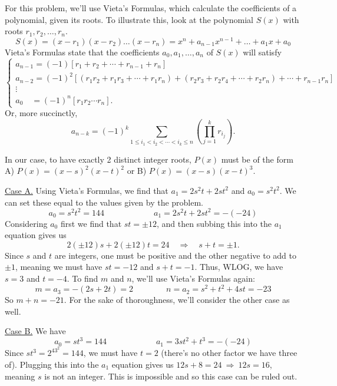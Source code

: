\begin{solution}[D]
    For this problem, we'll use Vieta's Formulas, which calculate the coefficients of a polynomial, given its roots. To illustrate this, look at the polynomial $S(x)$ with roots \( r_1, r_2, \dots, r_n \).
    \[
        S(x) = (x-r_1)(x-r_2)\dots(x-r_n) = x^n + a_{n-1} x^{n-1} + \dots + a_1 x + a_0
    \]
    Vieta's Formulas state that the coefficients \( a_0, a_1, \dots, a_n \) of \(S(x)\) will satisfy
    \begin{equation*}
    \begin{cases}
    a_{n-1} = (-1)[r_1 + r_2 + \cdots + r_{n-1} + r_n] \\
    a_{n-2} = (-1)^2[(r_1r_2 + r_1r_3 + \cdots + r_1r_n) + (r_2r_3 + r_2r_4 + \cdots + r_2r_n) + \cdots + r_{n-1}r_n] \\
    \vdots \\
     a_0 \quad = (-1)^n[r_1r_2 \cdots r_n].
    \end{cases}
    \end{equation*}
    Or, more succinctly, 
    \[
        a_{n-k}=(-1)^k\!\sum_{1 \leq i_1 < i_2 < \cdots < i_k \leq n} 
        \!\left( \prod_{j=1}^k r_{i_j} \right). 
    \]
    
    In our case, to have exactly 2 distinct integer roots, $P(x)$ must be of the form A) $P(x)=(x-s)^2(x-t)^2$ or B) $P(x)=(x-s)(x-t)^3$.
    
    \underline{Case A.} Using Vieta's Formulas, we find that \(a_1=2s^2t+2st^2\) and \(a_0=s^2t^2\). We can set these equal to the values given by the problem.
    \[
        a_0 = s^2t^2 = 144
        \qquad \qquad \qquad
        a_1 = 2s^2t+2st^2 = -(-24)
    \]
    Considering \(a_0\) first we find that \(st=\pm12\), and then subbing this into the \(a_1\) equation gives us
    \[
        2(\pm12)s+2(\pm12)t=24 \quad \Rightarrow \quad s+t=\pm1.
    \]
    Since \(s\) and \(t\) are integers, one must be positive and the other negative to add to \(\pm1\), meaning we must have \(st=-12\) and \(s+t=-1\). Thus, WLOG, we have $s=3$ and $t=-4$. To find \(m\) and \(n\), we'll use Vieta's Formulas again:
    \[
        m = a_3 = -(2s+2t) = 2
        \qquad \qquad
        n = a_2 = s^2 + t^2 + 4st = -23
    \]
    So \(m+n=\boxed{-21}\). For the sake of thoroughness, we'll consider the other case as well.
    
    \underline{Case B.} We have
    \[
        a_0 = st^3 = 144
        \qquad \qquad \qquad
        a_1 = 3st^2 + t^3 = -(-24)
    \]
    Since $st^3=2^43^2=144$, we must have $t=2$ (there's no other factor we have three of). Plugging this into the $a_1$ equation gives us \(12s + 8 = 24 \ \Rightarrow \ 12s=16\), meaning $s$ is not an integer. This is impossible and so this case can be ruled out.
\end{solution}

